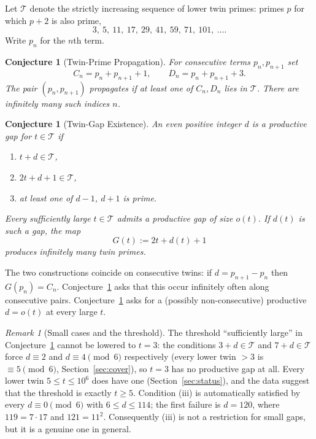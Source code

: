 \documentclass[11pt,a4paper]{article}
\newtheorem{conjecture}[theorem]{Conjecture}
\theoremstyle{definition}
\theoremstyle{remark}
\newtheorem{remark}[theorem]{Remark}
\newcommand{\T}{\mathcal{T}}
\begin{document}
Let $\T$ denote the strictly increasing sequence of lower twin primes: primes $p$ for which $p+2$ is also prime,
\[
3,\ 5,\ 11,\ 17,\ 29,\ 41,\ 59,\ 71,\ 101,\ \dots.
\]
Write $p_n$ for the $n$th term.

\begin{conjecture}[Twin-Prime Propagation]\label{conj:A}
For consecutive terms $p_n, p_{n+1}$ set
\begin{equation}\label{eq:CD}
C_n = p_n + p_{n+1} + 1,\qquad D_n = p_n + p_{n+1} + 3 .
\end{equation}
The pair $(p_n,p_{n+1})$ \emph{propagates} if at least one of $C_n, D_n$ lies in $\T$.
There are infinitely many such indices $n$.
\end{conjecture}

\begin{conjecture}[Twin-Gap Existence]\label{conj:B}
An even positive integer $d$ is a \emph{productive gap} for $t\in\T$ if
\begin{enumerate}
\item[(i)] $t+d\in\T$,
\item[(ii)] $2t+d+1\in\T$,
\item[(iii)] at least one of $d-1$, $d+1$ is prime.
\end{enumerate}
Every sufficiently large $t\in\T$ admits a productive gap of size $o(t)$.
If $d(t)$ is such a gap, the map
\[
G(t) := 2t + d(t) + 1
\]
produces infinitely many twin primes.
\end{conjecture}

The two constructions coincide on consecutive twins: if $d = p_{n+1}-p_n$ then $G(p_n) = C_n$.
Conjecture~\ref{conj:A} asks that this occur infinitely often along consecutive pairs.
Conjecture~\ref{conj:B} asks for a (possibly non-consecutive) productive $d = o(t)$ at every large $t$.

\begin{remark}[Small cases and the threshold]\label{rem:small}
The threshold ``sufficiently large'' in Conjecture~\ref{conj:B} cannot be lowered to $t = 3$: the conditions $3+d\in\T$ and $7+d\in\T$ force $d\equiv 2$ and $d\equiv 4 \pmod 6$ respectively (every lower twin $>3$ is $\equiv 5\pmod 6$, Section~\ref{sec:cover}), so $t=3$ has no productive gap at all.
Every lower twin $5\le t\le 10^6$ does have one (Section~\ref{sec:status}), and the data suggest that the threshold is exactly $t\ge 5$.
Condition (iii) is automatically satisfied by every $d\equiv 0\pmod 6$ with $6\le d\le 114$; the first failure is $d = 120$, where $119 = 7\cdot 17$ and $121 = 11^2$.
Consequently (iii) is not a restriction for small gaps, but it is a genuine one in general.
\end{remark}
\end{document}
